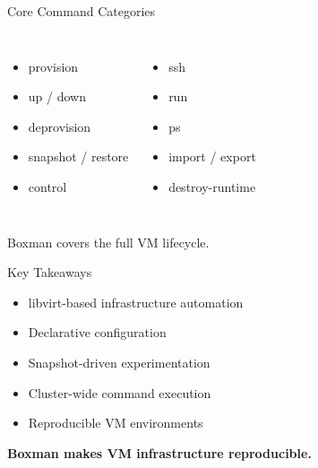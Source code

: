 \documentclass[aspectratio=169]{beamer}
\begin{document}

\begin{frame}{Core Command Categories}

\begin{columns}
\begin{itemize}
\item provision
\item up / down
\item deprovision
\item snapshot / restore
\item control
\end{itemize}

\begin{itemize}
\item ssh
\item run
\item ps
\item import / export
\item destroy-runtime
\end{itemize}
\end{columns}

\medskip
Boxman covers the full VM lifecycle.

\end{frame}


\begin{frame}{Key Takeaways}

\begin{itemize}
    \item libvirt-based infrastructure automation
    \item Declarative configuration
    \item Snapshot-driven experimentation
    \item Cluster-wide command execution
    \item Reproducible VM environments
\end{itemize}

\bigskip
\centering
\textbf{Boxman makes VM infrastructure reproducible.}

\end{frame}

\end{document}
